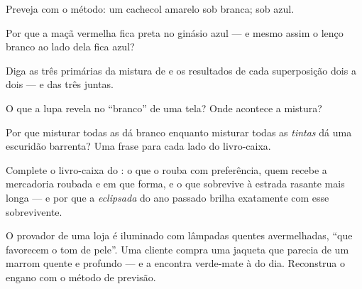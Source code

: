 \begin{exercise}[$\star$]\label{exo:g8:colors-spectra:5}
Preveja com o método: um cachecol amarelo sob  branca; sob 
azul.
\end{exercise}

\begin{exercise}[$\star$]\label{exo:g8:colors-spectra:6}
Por que a maçã vermelha fica preta no ginásio azul --- e mesmo assim
o lenço branco ao lado dela fica azul?
\end{exercise}

\begin{exercise}[$\star$]\label{exo:g8:colors-spectra:7}
Diga as três primárias da mistura de  e os resultados de cada
superposição dois a dois --- e das três juntas.
\end{exercise}

\begin{exercise}[$\star$]\label{exo:g8:colors-spectra:8}
O que a lupa revela no ``branco'' de uma tela? Onde acontece a
mistura?
\end{exercise}

\begin{exercise}[$\star\star$]\label{exo:g8:colors-spectra:9}
Por que misturar todas as \emph{} dá branco enquanto misturar
todas as \emph{tintas} dá uma escuridão barrenta? Uma frase para cada
lado do livro-caixa.
\end{exercise}

\begin{exercise}[$\star\star$]\label{exo:g8:colors-spectra:10}
Complete o livro-caixa do : o que o  rouba com
preferência, quem recebe a mercadoria roubada e em que forma, e o que
sobrevive à estrada rasante mais longa --- e por que a \emph{
eclipsada} do ano passado brilha exatamente com esse sobrevivente.
\end{exercise}

\begin{exercise}[$\star\star$]\label{exo:g8:colors-spectra:11}
O provador de uma loja é iluminado com lâmpadas quentes avermelhadas,
``que favorecem o tom de pele''. Uma cliente compra uma jaqueta que
parecia de um marrom quente e profundo --- e a encontra verde-mate à
 do dia. Reconstrua o engano com o método de previsão.
\end{exercise}

